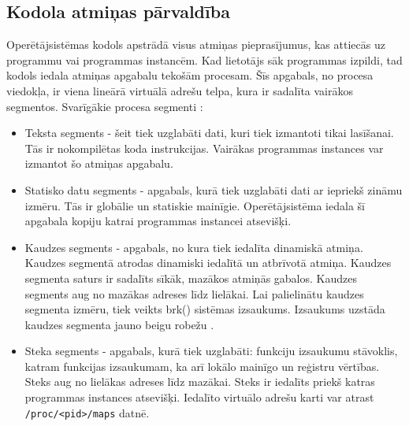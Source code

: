 \subsection{Kodola atmiņas pārvaldība}
Operētājsistēmas kodols apstrādā visus atmiņas pieprasījumus, kas attiecās uz programmu vai programmas instancēm.
Kad lietotājs sāk programmas izpildi, tad kodols iedala atmiņas apgabalu tekošām procesam.
Šīs apgabals, no procesa viedokļa, ir viena lineārā virtuālā adrešu telpa, kura ir sadalīta vairākos segmentos. 
Svarīgākie procesa segmenti  \cite {PETRSOF}:
\begin{itemize}
	\item   Teksta segments - šeit tiek uzglabāti dati, kuri tiek izmantoti tikai lasīšanai. Tās ir nokompilētas koda instrukcijas. 
    Vairākas programmas instances var izmantot šo atmiņas apgabalu.
    \item Statisko datu segments - apgabals, kurā tiek uzglabāti dati ar iepriekš zināmu izmēru. Tās ir globālie un statiskie mainīgie.
    Operētājsistēma iedala šī apgabala kopiju katrai programmas instancei atsevišķi.
    \item Kaudzes segments - apgabals, no kura tiek iedalīta dinamiskā atmiņa.
    Kaudzes segmentā atrodas dinamiski iedalītā un atbrīvotā atmiņa. Kaudzes segmenta saturs ir sadalīts sīkāk, mazākos atmiņās gabalos.
    Kaudzes segments aug no mazākas adreses līdz lielākai.  Lai palielinātu kaudzes segmenta izmēru, tiek veikts brk() sistēmas izsaukums. 
    Izsaukums uzstāda kaudzes segmenta jauno beigu robežu \cite{LINMAN}. 
    \item Steka segments - apgabals, kurā tiek uzglabāti: funkciju izsaukumu stāvoklis, katram funkcijas izsaukumam, ka arī lokālo mainīgo un reģistru vērtības. 
    Steks aug no lielākas adreses līdz mazākai. 
    Steks ir iedalīts priekš katras programmas instances atsevišķi.
     Iedalīto virtuālo adrešu karti var atrast \texttt{/proc/<pid>/maps} datnē.
\end{itemize} 

 
